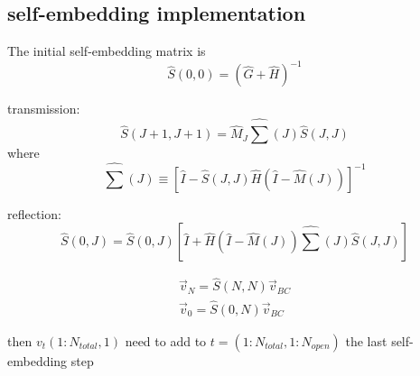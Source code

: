 \subsection {self-embedding implementation}

The initial self-embedding matrix is 
\begin{equation}
\hat{S}(0,0) = (\hat{G}+\hat{H})^{-1}
\end{equation}

transmission:
\begin{equation}
\hat{S}(J+1,J+1) = \hat{M}_J \hat{\sum}(J) \hat{S}(J,J)
\end{equation}
where
\begin{equation}
\hat{\sum}(J) \equiv \left[ \hat{I} - \hat{S}(J,J) \hat{H} \left( \hat{I} - \hat{M}(J) \right) \right]^{-1}
\end{equation}

reflection:
\begin{equation}
\hat{S}(0,J) = \hat{S}(0,J) \left[ \hat{I} + \hat{H} \left( \hat{I} - \hat{M}(J) \right) \hat{\sum}(J) \hat{S}(J,J) \right]
\end{equation}

\begin{equation}
\begin{gathered}
\vec{v}_N = \hat{S}(N,N) \vec{v}_{BC} \\
\vec{v}_0 = \hat{S}(0,N) \vec{v}_{BC}
\end{gathered}
\end{equation}

then $v_t(1:N_{total},1)$ need to add to $t=(1:N_{total},1:N_{open})$ the last self-embedding step


